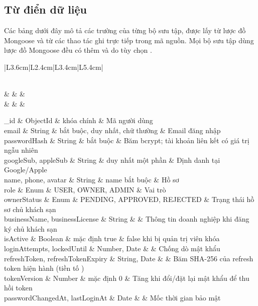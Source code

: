 
\subsection{Từ điển dữ liệu}

Các bảng dưới đây mô tả các trường của từng bộ sưu tập, được lấy từ lược đồ Mongoose và từ các thao tác ghi trực tiếp trong mã nguồn. Mọi bộ sưu tập dùng lược đồ Mongoose đều có thêm  và  do tùy chọn .

\newcommand{\ddtable}[3]{%
\begin{rtable}
\begin{longtable}{|L{3.6cm}|L{2.4cm}|L{3.4cm}|L{5.4cm}|}
\caption{#1}\label{#2}\\
\hline
\thead{Trường} & \thead{Kiểu} & \thead{Ràng buộc} & \thead{Ý nghĩa} \\ \hline
\endfirsthead
\hline
\thead{Trường} & \thead{Kiểu} & \thead{Ràng buộc} &  \\ \hline
\endhead
#3
\end{longtable}
\end{rtable}}

\ddtable{Từ điển dữ liệu bộ sưu tập }{tab:dd-users}{
\_id & ObjectId & khóa chính & Mã người dùng \\ \hline
email & String & bắt buộc, duy nhất, chữ thường & Email đăng nhập \\ \hline
passwordHash & String & bắt buộc & Băm bcrypt; tài khoản liên kết có giá trị ngẫu nhiên \\ \hline
googleSub, appleSub & String & duy nhất một phần & Định danh tại Google/Apple \\ \hline
name, phone, avatar & String & name bắt buộc & Hồ sơ \\ \hline
role & Enum & USER, OWNER, ADMIN & Vai trò \\ \hline
ownerStatus & Enum & PENDING, APPROVED, REJECTED & Trạng thái hồ sơ chủ khách sạn \\ \hline
businessName, businessLicense & String & & Thông tin doanh nghiệp khi đăng ký chủ khách sạn \\ \hline
isActive & Boolean & mặc định true & false khi bị quản trị viên khóa \\ \hline
loginAttempts, lockedUntil & Number, Date & & Chống dò mật khẩu \\ \hline
refreshToken, refreshTokenExpiry & String, Date & & Băm SHA-256 của refresh token hiện hành (tiền tố \code{sha256:}) \\ \hline
tokenVersion & Number & mặc định 0 & Tăng khi đổi/đặt lại mật khẩu để thu hồi token \\ \hline
passwordChangedAt, lastLoginAt & Date & & Mốc thời gian bảo mật \\ \hline
}

